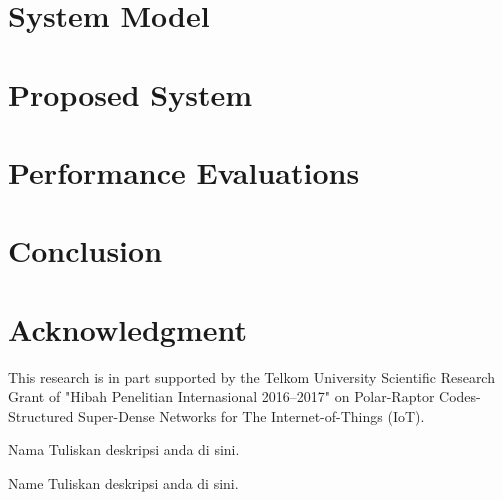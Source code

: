 \documentclass[journal,comsoc]{IEEEtran}
\begin{document}
\section{System Model}
\section{Proposed System}
\section{Performance Evaluations}
\section{Conclusion}
\appendices
\section*{Acknowledgment}
This research is in part supported by the Telkom University Scientific Research Grant of "Hibah Penelitian Internasional 2016--2017" on Polar-Raptor Codes-Structured Super-Dense Networks for The Internet-of-Things (IoT).

\ifCLASSOPTIONcaptionsoff
  \newpage
\fi





\begin{IEEEbiography}{Nama}
Tuliskan deskripsi anda di sini.
\end{IEEEbiography}

\begin{IEEEbiography}{Name}
Tuliskan deskripsi anda di sini.
\end{IEEEbiography}
\end{document}
